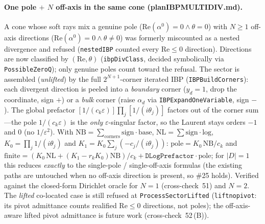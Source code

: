 \documentclass[11pt,a4paper]{article}
\begin{document}
\paragraph{One pole $+$ $N$ off-axis in the same cone (planIBPMULTIDIV.md).} A cone whose soft rays mix a genuine pole ($\mathrm{Re}(\alpha^0)=0\wedge\theta=0$) with $N\geq1$ off-axis directions ($\mathrm{Re}(\alpha^0)=0\wedge\theta\neq0$) was formerly miscounted as a nested divergence and refused (\texttt{nestedIBP} counted every $\mathrm{Re}\leq0$ direction). Directions are now classified by $(\mathrm{Re},\theta)$ (\texttt{ibpDivClass}, decided symbolically via \texttt{PossibleZeroQ}); only genuine poles count toward the refusal. The sector is assembled (\emph{unlifted}) by the full $2^{N+1}$-corner iterated IBP (\texttt{IBPBuildCorners}): each divergent direction is peeled into a \emph{boundary} corner ($y_d{=}1$, drop the coordinate, sign $+$) or a \emph{bulk} corner (raise $\alpha_d$ via \texttt{IBPExpandOneVariable}, sign $-$). The global prefactor $[1/(c_k\varepsilon)]\prod_j[1/(i\theta_j)]$ factors out of the corner sum---the pole $1/(c_k\varepsilon)$ is the \emph{only} $\varepsilon$-singular factor, so the Laurent stays orders $-1$ and $0$ (no $1/\varepsilon^2$). With $\mathrm{NB}=\sum_{\text{corners}}\mathrm{sign}\cdot\mathrm{base}$, $\mathrm{NL}=\sum\mathrm{sign}\cdot\mathrm{log}$, $K_0=\prod_j 1/(i\theta_j)$ and $K_1=K_0\sum_j(-c_j/(i\theta_j))$: $\text{pole}=K_0\,\mathrm{NB}/c_k$ and $\text{finite}=(K_0\,\mathrm{NL}+(K_1-r_kK_0)\mathrm{NB})/c_k+\texttt{DLogPrefactor}\cdot\text{pole}$; for $|D|=1$ this reduces \emph{exactly} to the single-pole / single-off-axis formulas (the existing paths are untouched when no off-axis direction is present, so \#25 holds). Verified against the closed-form Dirichlet oracle for $N=1$ (cross-check~51) and $N=2$. The \emph{lifted} co-located case is still refused at \texttt{ProcessSectorLifted} (\texttt{liftnopivot}: its pivot admittance counts realified $\mathrm{Re}\leq0$ directions, not poles); the off-axis-aware lifted pivot admittance is future work (cross-check~52\,(B)).
\end{document}
